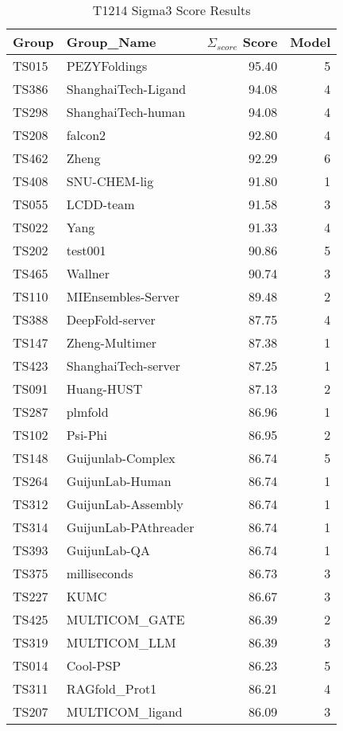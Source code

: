 \begin{table*}[ht]
\caption{T1214 Sigma3 Score Results}
\label{tab:T1214_Sigma_score_split}
\scriptsize
\begin{minipage}[t]{0.48\textwidth}
\centering
\begin{tabular}{llrr}
\toprule
Group & Group\_Name & $\Sigma_{score}$ Score & Model \\ 
\midrule
TS015 & PEZYFoldings & 95.40 & 5 \\ 
TS386 & ShanghaiTech-Ligand & 94.08 & 4 \\ 
TS298 & ShanghaiTech-human & 94.08 & 4 \\ 
TS208 & falcon2 & 92.80 & 4 \\ 
TS462 & Zheng & 92.29 & 6 \\ 
TS408 & SNU-CHEM-lig & 91.80 & 1 \\ 
TS055 & LCDD-team & 91.58 & 3 \\ 
TS022 & Yang & 91.33 & 4 \\ 
TS202 & test001 & 90.86 & 5 \\ 
TS465 & Wallner & 90.74 & 3 \\ 
TS110 & MIEnsembles-Server & 89.48 & 2 \\ 
TS388 & DeepFold-server & 87.75 & 4 \\ 
TS147 & Zheng-Multimer & 87.38 & 1 \\ 
TS423 & ShanghaiTech-server & 87.25 & 1 \\ 
TS091 & Huang-HUST & 87.13 & 2 \\ 
TS287 & plmfold & 86.96 & 1 \\ 
TS102 & Psi-Phi & 86.95 & 2 \\ 
TS148 & Guijunlab-Complex & 86.74 & 5 \\ 
TS264 & GuijunLab-Human & 86.74 & 1 \\ 
TS312 & GuijunLab-Assembly & 86.74 & 1 \\ 
TS314 & GuijunLab-PAthreader & 86.74 & 1 \\ 
TS393 & GuijunLab-QA & 86.74 & 1 \\ 
TS375 & milliseconds & 86.73 & 3 \\ 
TS227 & KUMC & 86.67 & 3 \\ 
TS425 & MULTICOM\_GATE & 86.39 & 2 \\ 
TS319 & MULTICOM\_LLM & 86.39 & 3 \\ 
TS014 & Cool-PSP & 86.23 & 5 \\ 
TS311 & RAGfold\_Prot1 & 86.21 & 4 \\ 
TS207 & MULTICOM\_ligand & 86.09 & 3 \\ 

\end{tabular}
\end{minipage}
\end{table*}
